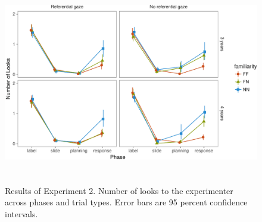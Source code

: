 \documentclass[a4paper,man,apacite,floatsintext]{apa6}
\newenvironment{CodeChunk}{}{}
\begin{document}
\begin{CodeChunk}
\begin{figure}[b]

{\centering \includegraphics[width=5.75in,height=3.5in]{figs/results_e2-1} 

}

\caption[Results of Experiment 2]{Results of Experiment 2. Number of looks to the experimenter across phases and trial types. Error bars are 95 percent confidence intervals.}\label{fig:results_e2}
\end{figure}
\end{CodeChunk}
\end{document}
